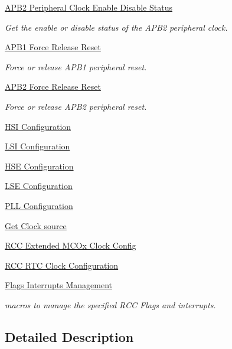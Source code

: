 \begin{DoxyCompactItemize}
\hyperlink{group___r_c_c___a_p_b2___peripheral___clock___enable___disable___status}{A\+P\+B2 Peripheral Clock Enable Disable Status}
\begin{DoxyCompactList}\small\item\em Get the enable or disable status of the A\+P\+B2 peripheral clock. \end{DoxyCompactList}\item 
\hyperlink{group___r_c_c___a_p_b1___force___release___reset}{A\+P\+B1 Force Release Reset}
\begin{DoxyCompactList}\small\item\em Force or release A\+P\+B1 peripheral reset. \end{DoxyCompactList}\item 
\hyperlink{group___r_c_c___a_p_b2___force___release___reset}{A\+P\+B2 Force Release Reset}
\begin{DoxyCompactList}\small\item\em Force or release A\+P\+B2 peripheral reset. \end{DoxyCompactList}\item 
\hyperlink{group___r_c_c___h_s_i___configuration}{H\+S\+I Configuration}
\item 
\hyperlink{group___r_c_c___l_s_i___configuration}{L\+S\+I Configuration}
\item 
\hyperlink{group___r_c_c___h_s_e___configuration}{H\+S\+E Configuration}
\item 
\hyperlink{group___r_c_c___l_s_e___configuration}{L\+S\+E Configuration}
\item 
\hyperlink{group___r_c_c___p_l_l___configuration}{P\+L\+L Configuration}
\item 
\hyperlink{group___r_c_c___get___clock__source}{Get Clock source}
\item 
\hyperlink{group___r_c_c_ex___m_c_ox___clock___config}{R\+C\+C Extended M\+C\+Ox Clock Config}
\item 
\hyperlink{group___r_c_c___r_t_c___clock___configuration}{R\+C\+C R\+T\+C Clock Configuration}
\item 
\hyperlink{group___r_c_c___flags___interrupts___management}{Flags Interrupts Management}
\begin{DoxyCompactList}\small\item\em macros to manage the specified R\+CC Flags and interrupts. \end{DoxyCompactList}\end{DoxyCompactItemize}


\subsection{Detailed Description}
